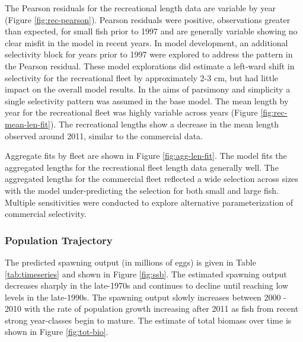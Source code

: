 \documentclass[11pt,
  english,
  a4paper,
]{article}
\begin{document}
\leavevmode\tagmcend\tagstructend\par


The Pearson residuals for the recreational length data are variable by year (Figure \ref{fig:rec-pearson}). Pearson residuals were positive, observations greater than expected, for small fish prior to 1997 and are generally variable showing no clear misfit in the model in recent years. In model development, an additional selectivity block for years prior to 1997 were explored to address the pattern in the Pearson residual. These model explorations did estimate a left-ward shift in selectivity for the recreational fleet by approximately 2-3 cm, but had little impact on the overall model results. In the aims of parsimony and simplicity a single selectivity pattern was assumed in the base model. The mean length by year for the recreational fleet was highly variable across years (Figure \ref{fig:rec-mean-len-fit}). The recreational lengths show a decrease in the mean length observed around 2011, similar to the commercial data.

\leavevmode\tagmcend\tagstructend\par


Aggregate fits by fleet are shown in Figure \ref{fig:agg-len-fit}. The model fits the aggregated lengths for the recreational fleet length data generally well. The aggregated lengths for the commercial fleet reflected a wide selection across sizes with the model under-predicting the selection for both small and large fish. Multiple sensitivities were conducted to explore alternative parameterization of commercial selectivity.

\leavevmode\tagmcend\tagstructend\par


\hypertarget{population-trajectory}{%
\subsubsection{Population Trajectory}\label{population-trajectory}}

\leavevmode\tagmcend\tagstructend


The predicted spawning output (in millions of eggs) is given in Table \ref{tab:timeseries} and shown in Figure \ref{fig:ssb}. The estimated spawning output decreases sharply in the late-1970s and continues to decline until reaching low levels in the late-1990s. The spawning output slowly increases between 2000 - 2010 with the rate of population growth increasing after 2011 as fish from recent strong year-classes begin to mature. The estimate of total biomass over time is shown in Figure \ref{fig:tot-bio}.
\end{document}
